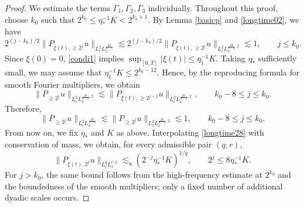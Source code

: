 \documentclass[reqno,11pt]{amsart}
\theoremstyle{plain}
\theoremstyle{definition}
\numberwithin{equation}{section}
\numberwithin{theorem}{section}
\def\geq{\geqslant}
\def\leq{\leqslant}
\begin{document}
\begin{proof}
We estimate the terms $\Gamma_1,\Gamma_2,\Gamma_3$ individually.
Throughout this proof, choose $k_0$ such that
$2^{k_0}\leq\eta_{\ast}^{-1}K<2^{k_0+1}$.
By Lemma \ref{basicp} and \eqref{longtime02}, we have
\begin{equation}\label{longtime28}
 2^{(j-k_0)/2}\|P_{\xi(t),\geq2^j}u\|_{L_t^2L_x^{\frac{2d}{d-2}}}
 \lesssim
 2^{(j-k_0)/2}\|P_{\xi(t),\geq2^j}u\|_{L_t^2L_x^{\frac{2d}{d-2},2}}
 \lesssim1,\qquad j\leq k_0.
\end{equation}
Since $\xi(0)=0$, \eqref{condi1} implies
$\sup_{[0,T]}|\xi(t)|\leq\eta_1^{-1}K$.
Taking $\eta_{\ast}$ sufficiently small, we may assume that
$\eta_1^{-1}K\leq2^{k_0-12}$. Hence, by the reproducing formula for smooth Fourier multipliers, we obtain
\begin{equation}\label{longtime29}
 \|P_{\geq2^j}u\|_{L_t^2L_x^{\frac{2d}{d-2},2}}
 \lesssim\|P_{\xi(t),\geq2^{j-2}}u\|_{L_t^2L_x^{\frac{2d}{d-2},2}},
 \qquad k_0-8\leq j\leq k_0.
\end{equation}
Therefore,
\begin{equation}\label{longtime2}
 \|P_{\geq2^j}u\|_{L_t^2L_x^{\frac{2d}{d-2}}}
 \lesssim\|P_{\geq2^j}u\|_{L_t^2L_x^{\frac{2d}{d-2},2}}
 \lesssim1,\qquad k_0-8\leq j\leq k_0.
\end{equation}
From now on, we fix $\eta_{\ast}$ and $K$ as above. Interpolating
\eqref{longtime28} with conservation of mass, we obtain, for every admissible
pair $(q,r)$,
\[
 \|P_{\xi(t),2^j}u\|_{L_t^qL_x^{r,2}}
 \lesssim_u (2^{-j}\eta_{\ast}^{-1}K)^{1/q},
 \qquad 2^j\leq8\eta_{\ast}^{-1}K.
\]
For $j>k_0$, the same bound follows from the high-frequency estimate at
$2^{k_0}$ and the boundedness of the smooth multipliers; only a fixed number
of additional dyadic scales occurs.


\end{proof}
\end{document}
